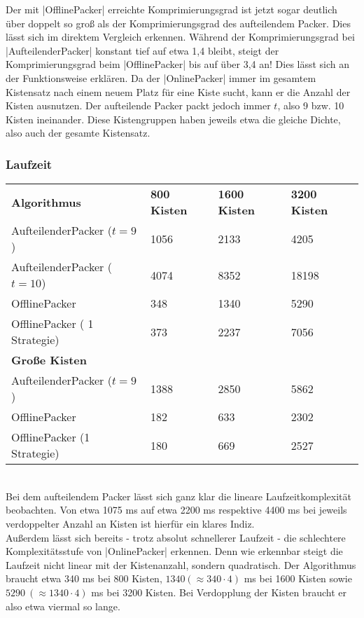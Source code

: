  Der mit |OfflinePacker| erreichte Komprimierungsgrad ist jetzt sogar deutlich über doppelt so groß als der Komprimierungsgrad des aufteilendem Packer.
 Dies lässt sich im direktem Vergleich erkennen.
 Während der Komprimierungsgrad bei |AufteilenderPacker| konstant tief auf etwa 1,4 bleibt,
  steigt der Komprimierungsgrad beim |OfflinePacker| bis auf über 3,4 an!
 Dies lässt sich an der Funktionsweise erklären.
 Da der |OnlinePacker| immer im gesamtem Kistensatz nach einem neuem Platz für eine Kiste sucht, kann er die Anzahl der Kisten ausnutzen.
 Der aufteilende Packer packt jedoch immer $t$, also 9 bzw. 10 Kisten ineinander.
 Diese Kistengruppen haben jeweils etwa die gleiche Dichte, also auch der gesamte Kistensatz.

\subsubsection*{Laufzeit}
\begin{tabular}{llll}
\textbf{Algorithmus} 	& \textbf{800 Kisten} 	& \textbf{1600 Kisten} 	& \textbf{3200 Kisten} 	\\
 AufteilenderPacker ($t=9$)	& 1056		& 2133			& 4205			\\
 AufteilenderPacker ($t=10$)  	& 4074		& 8352			& 18198			\\
 OfflinePacker			& 348		& 1340			& 5290			\\
 OfflinePacker ( 1 Strategie)	& 373		& 2237			& 7056		\vspace*{.48em} \\
\textbf{Große Kisten} & & & \\
 AufteilenderPacker ($t=9$)  	& 1388		& 2850			& 5862			\\
 OfflinePacker			& 182		& 633			& 2302			\\
 OfflinePacker (1 Strategie)	& 180		& 669			& 2527			\\
\end{tabular} \\

 Bei dem aufteilendem Packer lässt sich ganz klar die lineare Laufzeitkomplexität beobachten.
 Von etwa 1075 ms auf etwa 2200 ms respektive 4400 ms bei jeweils verdoppelter Anzahl an Kisten ist hierfür ein klares Indiz. \\
 Außerdem lässt sich bereits - trotz absolut schnellerer Laufzeit - die schlechtere Komplexitätsstufe von |OnlinePacker| erkennen.
 Denn wie erkennbar steigt die Laufzeit nicht linear mit der Kistenanzahl, sondern quadratisch.
 Der Algorithmus braucht etwa 340 ms bei 800 Kisten, $1340 (\approx 340 \cdot 4)$ ms bei 1600 Kisten sowie $5290\ (\approx 1340 \cdot 4)$ ms bei 3200 Kisten.
 Bei Verdopplung der Kisten braucht er also etwa viermal so lange.

